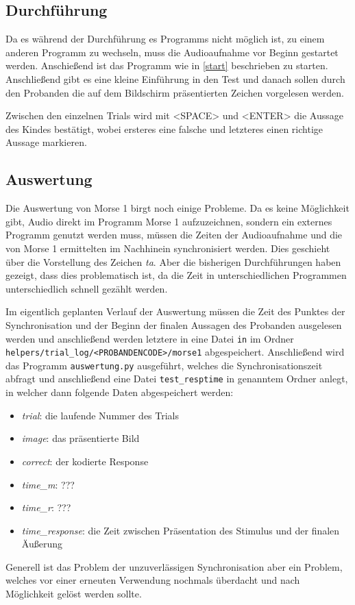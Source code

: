 \documentclass[a4paper]{scrartcl}
\newtheorem[M]{thmL}{Definition}
\begin{document}
\subsection{Durchführung}
Da es während der Durchführung es Programms nicht möglich ist, zu einem anderen Programm zu wechseln, muss die Audioaufnahme vor Beginn gestartet werden. Anschießend ist das Programm wie in \autoref{start} beschrieben zu starten. Anschließend gibt es eine kleine Einführung in den Test und danach sollen durch den Probanden die auf dem Bildschirm präsentierten Zeichen vorgelesen werden.

Zwischen den einzelnen Trials wird mit <SPACE> und <ENTER> die Aussage des Kindes bestätigt, wobei ersteres eine falsche und letzteres einen richtige Aussage markieren.

\subsection{Auswertung}
Die Auswertung von Morse 1 birgt noch einige Probleme. Da es keine Möglichkeit gibt, Audio direkt im Programm Morse 1 aufzuzeichnen, sondern ein externes Programm genutzt werden muss, müssen die Zeiten der Audioaufnahme und die von Morse 1 ermittelten im Nachhinein synchronisiert werden. Dies geschieht über die Vorstellung des Zeichen \emph{ta}. Aber die bisherigen Durchführungen haben gezeigt, dass dies problematisch ist, da die Zeit in unterschiedlichen Programmen unterschiedlich schnell gezählt werden.

Im eigentlich geplanten Verlauf der Auswertung müssen die Zeit des Punktes der Synchronisation und der Beginn der finalen Aussagen des Probanden ausgelesen werden und anschließend werden letztere in eine Datei \verb+in+ im Ordner \verb+helpers/trial_log/<PROBANDENCODE>/morse1+ abgespeichert. Anschließend wird das Programm \verb+auswertung.py+ ausgeführt, welches die Synchronisationszeit abfragt und anschließend eine Datei \verb+test_resptime+ in genanntem Ordner anlegt, in welcher dann folgende Daten abgespeichert werden:
\begin{itemize}
	\item \emph{trial}: die laufende Nummer des Trials
	\item \emph{image}: das präsentierte Bild
	\item \emph{correct}: der kodierte Response
	\item \emph{time\_m}: ???
	\item \emph{time\_r}: ???
	\item \emph{time\_response}: die Zeit zwischen Präsentation des Stimulus und der finalen Äußerung
\end{itemize}
Generell ist das Problem der unzuverlässigen Synchronisation aber ein Problem, welches vor einer erneuten Verwendung nochmals überdacht und nach Möglichkeit gelöst werden sollte.
\end{document}

